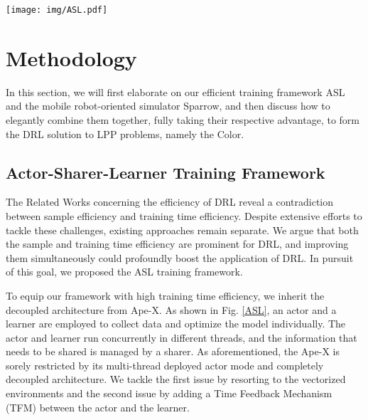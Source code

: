 \documentclass[journal]{IEEEtran}
\begin{document}
\begin{figure*}[!t]
	\centering
	\texttt{[image: img/ASL.pdf]}
	\caption{Schematic of the Actor-Sharer-Learner training framework}
	\label{ASL}
\end{figure*}

\section{Methodology}
\label{section3}

In this section, we will first elaborate on our efficient training framework ASL and the mobile robot-oriented simulator Sparrow, and then discuss how to elegantly combine them together, fully taking their respective advantage, to form the DRL solution to LPP problems, namely the Color.

\subsection{Actor-Sharer-Learner Training Framework}

The Related Works concerning the efficiency of DRL reveal a contradiction between sample efficiency and training time efficiency. Despite extensive efforts to tackle these challenges, existing approaches remain separate. We argue that both the sample and training time efficiency are prominent for DRL, and improving them simultaneously could profoundly boost the application of DRL. In pursuit of this goal, we proposed the ASL training framework. 

To equip our framework with high training time efficiency, we inherit the decoupled architecture from Ape-X. As shown in Fig. \ref{ASL}, an actor and a learner are employed to collect data and optimize the model individually. The actor and learner run concurrently in different threads, and the information that needs to be shared is managed by a sharer. As aforementioned, the Ape-X is sorely restricted by its multi-thread deployed actor mode and completely decoupled architecture. We tackle the first issue by resorting to the vectorized environments \cite{envpool} and the second issue by adding a Time Feedback Mechanism (TFM) between the actor and the learner. 
\end{document}

